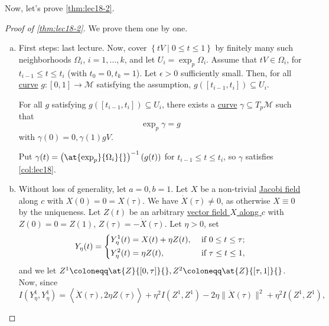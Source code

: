 Now, let's prove \autoref{thm:lec18-2}.
\begin{proof}[Proof of \autoref{thm:lec18-2}]
	We prove them one by one.
	\begin{enumerate}[(a)]
		\item First steps: last lecture. Now, cover \(\left\{ tV \mid 0 \leq t \leq 1 \right\} \) by finitely many such neighborhoods \(\Omega _i\), \(i = 1, \ldots , k\), and let \(U_i = \exp _p \Omega _i\). Assume that \(tV\in \Omega _i\), for \(t_{i-1} \leq t \leq t_i\) (with \(t_0 = 0, t_k = 1\)). Let \(\epsilon > 0\) sufficiently small. Then, for all \hyperref[def:curve]{curve} \(g\colon [0, 1] \to \mathcal{M} \) satisfying the assumption, \(g([t_{i-1}, t_i]) \subseteq U_i\).

		      \begin{claim}
			      For all \(g\) satisfying \(g([t_{i-1}, t_i]) \subseteq U_i\), there exists a \hyperref[def:curve]{curve} \(\gamma \subseteq T_p \mathcal{M} \) such that
			      \[
				      \exp _p \gamma = g
			      \]
			      with \(\gamma (0) = 0 , \gamma (1) g V\).
		      \end{claim}
		      \begin{explanation}
			      Put \(\gamma (t) = \left( \at{\exp _p}{\Omega _i}{} \right)^{-1} (g(t)) \) for \(t_{i-1} \leq t \leq t_i\), so \(\gamma \) satisfies \autoref{col:lec18}.
		      \end{explanation}
		\item  Without loss of generality, let \(a = 0, b= 1\). Let \(X\) be a non-trivial \hyperref[def:Jacobi-field]{Jacobi field} along \(c\) with \(X(0) = 0 = X(\tau )\). We have \(\dot{X} (\tau ) \neq 0\), as otherwise \(X \equiv 0\) by the uniqueness. Let \(Z(t)\) be an arbitrary \hyperref[def:vector-field-along-curve]{vector field \(X\) along \(c\)} with \(Z(0) = 0 = Z(1)\), \(Z(\tau ) = - \dot{X} (\tau )\). Let \(\eta > 0\), set
		      \[
			      Y_\eta (t) = \begin{dcases}
				      Y_\eta ^1(t) = X(t) + \eta Z(t), & \text{ if } 0 \leq t \leq \tau ; \\
				      Y_\eta ^2(t) = \eta Z(t),        & \text{ if } \tau \leq t \leq 1 ,
			      \end{dcases}
		      \]
		      and we let \(Z^1 \coloneqq \at{Z}{[0, \tau ]}{} , Z^2 \coloneqq \at{Z}{[\tau , 1]}{} \). Now, since
		      \[
			      I(Y_\eta ^1, Y_\eta ^1)
			      = \left\langle \dot{X} (\tau ), 2 \eta Z(\tau ) \right\rangle + \eta ^2 I(Z^1, Z^1) - 2 \eta \lVert \dot{X}(\tau)\rVert^2 + \eta ^2 I(Z^1, Z^1),
\]
\end{enumerate}
\end{proof}
